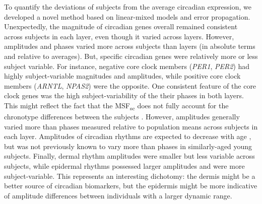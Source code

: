 To quantify the deviations of subjects from the average circadian expression, we developed a novel method based on linear-mixed models and error propagation. Unexpectedly, the magnitude of circadian genes overall remained consistent across subjects in each layer, even though it varied across layers. However, amplitudes and phases varied more across subjects than layers (in absolute terms and relative to averages). But, specific circadian genes were relatively more or less subject variable. For instance, negative core clock members (\textit{PER1}, \textit{PER2}) had highly subject-variable magnitudes and amplitudes, while positive core clock members (\textit{ARNTL}, \textit{NPAS2}) were the opposite. One consistent feature of the core clock genes was the high subject-variability of the their phases in both layers. This might reflect the fact that the MSF\textsubscript{sc} does not fully account for the chronotype differences between the subjects . However, amplitudes generally varied more than phases measured relative to population means across subjects in each layer. Amplitudes of circadian rhythms are expected to decrease with age \cite{Blacher2022}, but was not previously known to vary more than phases in similarly-aged young subjects. Finally, dermal rhythm amplitudes were smaller but less variable across subjects, while epidermal rhythms possessed larger amplitudes and were more subject-variable. This represents an interesting dichotomy: the dermis might be a better source of circadian biomarkers, but the epidermis might be more indicative of amplitude differences between individuals with a larger dynamic range.


